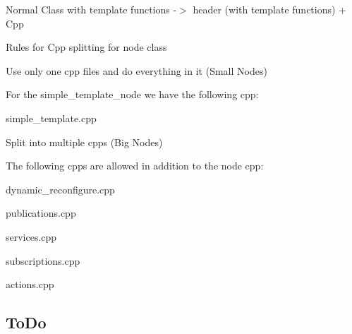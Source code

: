 \begin{DoxyEnumerate}
\begin{DoxyEnumerate}
\begin{DoxyItemize}
\item Normal Class with template functions -\/$>$ header (with template functions) + Cpp
\end{DoxyItemize}
\end{DoxyEnumerate}
\begin{DoxyEnumerate}
\item Rules for Cpp splitting for node class
\begin{DoxyItemize}
\item Use only one cpp files and do everything in it (Small Nodes)
\begin{DoxyItemize}
\item For the simple\+\_\+template\+\_\+node we have the following cpp\+:
\begin{DoxyItemize}
\item simple\+\_\+template.\+cpp
\end{DoxyItemize}
\end{DoxyItemize}
\item Split into multiple cpps (Big Nodes)
\begin{DoxyItemize}
\item The following cpps are allowed in addition to the node cpp\+:
\begin{DoxyItemize}
\item dynamic\+\_\+reconfigure.\+cpp
\item publications.\+cpp
\item services.\+cpp
\item subscriptions.\+cpp
\item actions.\+cpp 


\end{DoxyItemize}
\end{DoxyItemize}
\end{DoxyItemize}
\end{DoxyEnumerate}
\end{DoxyEnumerate}

\subsection*{To\+Do}


